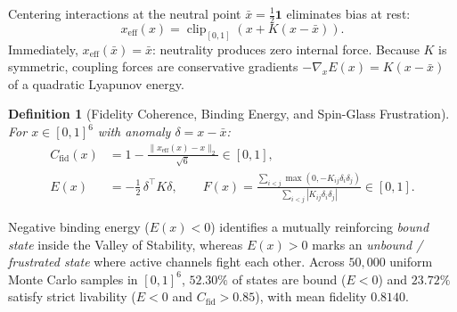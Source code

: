 \documentclass[11pt,letterpaper]{article}
\newtheorem{definition}{Definition}
\begin{document}
Centering interactions at the neutral point $\bar{x} = \tfrac{1}{2}\mathbf{1}$ eliminates bias at rest:
\begin{equation}
  x_{\mathrm{eff}}(x) = \operatorname{clip}_{[0,1]}\!\left(x + K(x - \bar{x})\right).
\end{equation}
Immediately, $x_{\mathrm{eff}}(\bar{x}) = \bar{x}$: neutrality produces zero internal force. Because $K$ is symmetric, coupling forces are conservative gradients $-\nabla_x E(x) = K(x - \bar{x})$ of a quadratic Lyapunov energy.

\begin{definition}[Fidelity Coherence, Binding Energy, and Spin-Glass Frustration]
For $x \in [0,1]^6$ with anomaly $\delta = x - \bar{x}$:
\begin{align}
  C_{\mathrm{fid}}(x) &= 1 - \frac{\|x_{\mathrm{eff}}(x) - x\|_2}{\sqrt{6}} \in [0, 1], \\
  E(x) &= -\frac{1}{2}\,\delta^\top K \delta, \qquad
  F(x) = \frac{\sum_{i<j} \max(0, -K_{ij}\delta_i\delta_j)}{\sum_{i<j} |K_{ij}\delta_i\delta_j|} \in [0, 1].
\end{align}
\end{definition}

Negative binding energy ($E(x) < 0$) identifies a mutually reinforcing \emph{bound state} inside the Valley of Stability, whereas $E(x) > 0$ marks an \emph{unbound / frustrated state} where active channels fight each other. Across $50{,}000$ uniform Monte Carlo samples in $[0,1]^6$, $52.30\%$ of states are bound ($E < 0$) and $23.72\%$ satisfy strict livability ($E < 0$ and $C_{\mathrm{fid}} > 0.85$), with mean fidelity $0.8140$.
\end{document}
